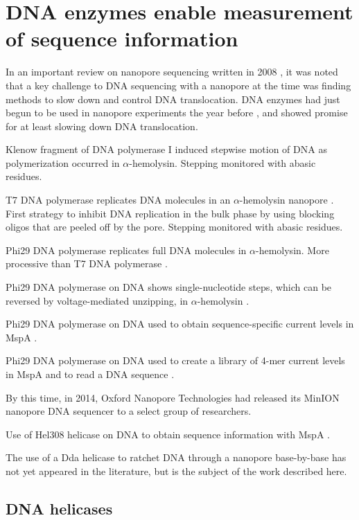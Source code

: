 \section{DNA enzymes enable measurement of sequence information}

In an important review on nanopore sequencing written in 2008 \citep{Branton2008}, it was noted that a key challenge to DNA sequencing with a nanopore at the time was finding methods to slow down and control DNA translocation.  DNA enzymes had just begun to be used in nanopore experiments the year before \citep{Astier2007, Hornblower2007}, and showed promise for at least slowing down DNA translocation.

Klenow fragment of DNA polymerase I induced stepwise motion of DNA as polymerization occurred \citep{Chu2010} in $\alpha$-hemolysin.  Stepping monitored with abasic residues.

T7 DNA polymerase replicates DNA molecules in an $\alpha$-hemolysin nanopore \citep{Olasagasti2010}.  First strategy to inhibit DNA replication in the bulk phase by using blocking oligos that are peeled off by the pore.  Stepping monitored with abasic residues.

Phi29 DNA polymerase replicates full DNA molecules in $\alpha$-hemolysin.  More processive than T7 DNA polymerase \citep{Lieberman2010}.

Phi29 DNA polymerase on DNA shows single-nucleotide steps, which can be reversed by voltage-mediated unzipping, in $\alpha$-hemolysin \citep{Cherf2012}.

Phi29 DNA polymerase on DNA used to obtain sequence-specific current levels in MspA \citep{Manrao2012}.

Phi29 DNA polymerase on DNA used to create a library of 4-mer current levels in MspA and to read a DNA sequence \citep{Laszlo2014}.

By this time, in 2014, Oxford Nanopore Technologies had released its MinION nanopore DNA sequencer to a select group of researchers.

Use of Hel308 helicase on DNA to obtain sequence information with MspA \citep{Derrington2015}.

The use of a Dda helicase to ratchet DNA through a nanopore base-by-base has not yet appeared in the literature, but is the subject of the work described here.

\subsection{DNA helicases}

